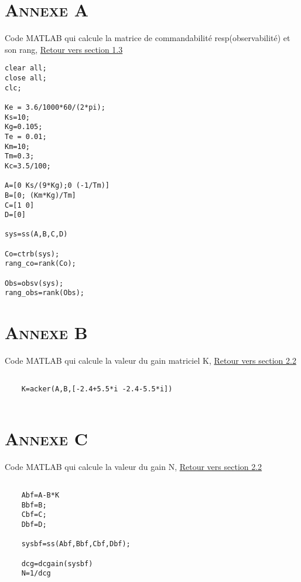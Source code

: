 
\begin{appendices}

\chapter*{\textsc{Annexe A}}
	
	Code MATLAB qui calcule la matrice de commandabilité resp(observabilité) et son rang,\label{Annexe A} \hyperref[section 1.2]{Retour vers section 1.3}
	
	\begin{lstlisting}	
clear all;
close all;
clc;

Ke = 3.6/1000*60/(2*pi);
Ks=10;
Kg=0.105;
Te = 0.01;
Km=10;
Tm=0.3;
Kc=3.5/100;

A=[0 Ks/(9*Kg);0 (-1/Tm)]
B=[0; (Km*Kg)/Tm]
C=[1 0]
D=[0]

sys=ss(A,B,C,D)

Co=ctrb(sys);
rang_co=rank(Co);

Obs=obsv(sys);
rang_obs=rank(Obs);

	\end{lstlisting}	
	
	
\chapter*{\textsc{Annexe B}}
	
	Code MATLAB qui calcule la valeur du gain matriciel K,\label{annexe B} \hyperref[K]{Retour vers section 2.2}
	\begin{lstlisting}	
	
	K=acker(A,B,[-2.4+5.5*i -2.4-5.5*i])
	
	\end{lstlisting}	
	
\chapter*{\textsc{Annexe C}}
	
	Code MATLAB qui calcule la valeur du gain N,\label{Annexe C} \hyperref[N]{Retour vers section 2.2}
	\begin{lstlisting}	
	
	Abf=A-B*K
	Bbf=B;
	Cbf=C;
	Dbf=D;
	
	sysbf=ss(Abf,Bbf,Cbf,Dbf);

	dcg=dcgain(sysbf) 
	N=1/dcg
	
	\end{lstlisting}	
	
\end{appendices}	